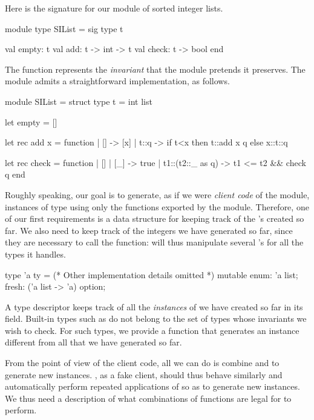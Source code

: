 Here is the signature for our module of sorted integer lists.
%
\begin{ocamlcode}
module type SIList = sig
  type t

  val empty: t
  val add: t -> int -> t
  val check: t -> bool
end
\end{ocamlcode}
%
The  function represents the \emph{invariant} that the module
pretends it preserves. The module admits a straightforward implementation, as
follows.
%
\begin{ocamlcode}
module SIList = struct
  type t = int list

  let empty = []

  let rec add x = function
    | [] -> [x]
    | t::q -> if t<x then t::add x q else x::t::q

  let rec check = function
    | [] | [_] -> true
    | t1::(t2::_ as q) -> t1 <= t2 && check q
end
\end{ocamlcode}
%
Roughly speaking, our goal is to generate, as if we were \emph{client code} of
the module, instances of type  using only the functions exported by the
module. Therefore, one of our first requirements is a data structure for keeping
track of the 's created so far. We also need to keep track of the
integers we have generated so far, since they are necessary to call the
 function: \arti will thus manipulate several 's for all the
types it handles.
%
\begin{ocamlcode}
type 'a ty = {
  (* Other implementation details omitted *)
  mutable enum: 'a list;
  fresh: ('a list -> 'a) option;
}
\end{ocamlcode}
%
A type descriptor  keeps track of all the \emph{instances} of
 we have created so far in its  field. Built-in types such
as  do not belong to the set of types whose invariants we wish to
check. For such types, we provide a  function that generates an
instance different from all that we have generated so far.

From the point of view of the client code, all we can do is combine
 and  to generate new instances. \arti, as a fake client,
should thus behave similarly and automatically perform repeated applications of
 so as to generate new instances. We thus need a description of what
combinations of functions are legal for \arti to perform.

